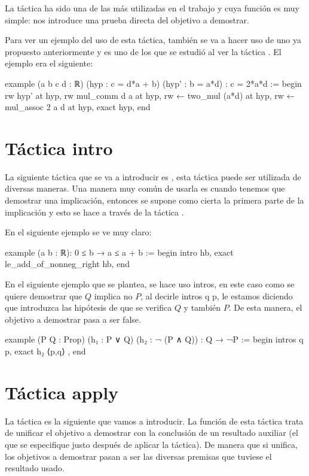 La táctica  ha sido una de las más utilizadas en
el trabajo y cuya función es muy simple: nos introduce una prueba
directa del objetivo a demostrar.

Para ver un ejemplo del uso de esta táctica, también se va a hacer uso
de uno ya propuesto anteriormente y es uno de los que se estudió al ver
la táctica . El ejemplo era el siguiente:

\begin{leancode}
example (a b c d : ℝ) (hyp : c = d*a + b) (hyp' : b = a*d) : c = 2*a*d :=
begin
  rw hyp' at hyp,
  rw mul_comm d a at hyp,
  rw ← two_mul (a*d) at hyp,
  rw ← mul_assoc 2 a d at hyp,
  exact hyp,
end
\end{leancode}

\section{Táctica intro}

La siguiente táctica que se va a introducir es
, esta táctica puede ser utilizada de
diversas maneras. Una manera muy común de usarla es cuando tenemos que
demostrar una implicación, entonces se supone como cierta la primera
parte de la implicación y esto se hace a través de la táctica
.

En el siguiente ejemplo se ve muy claro:

\begin{leancode}
example (a b : ℝ): 0 ≤ b → a ≤ a + b :=
begin
  intro hb,
  exact le_add_of_nonneg_right hb,
end
\end{leancode}

En el siguiente ejemplo que se plantea, se hace uso intros, en este caso
como se quiere demostrar que \(Q\) implica no \(P\), al decirle intros q
p, le estamos diciendo que introduzca las hipótesis de que se verifica
\(Q\) y también \(P\). De esta manera, el objetivo a demostrar pasa a
ser false.
\begin{leancode}
example (P Q : Prop) (h₁ : P ∨ Q) (h₂ : ¬ (P ∧ Q)) : Q → ¬P :=
begin
  intros q p,
  exact h₂ ⟨p,q⟩ ,
end
\end{leancode}

\section{Táctica apply}

La táctica  es la siguiente que vamos a
introducir. La función de esta táctica trata de unificar el objetivo a
demostrar con la conclusión de un resultado auxiliar (el que se
especifique justo después de aplicar la táctica). De manera que si
unifica, los objetivos a demostrar pasan a ser las diversas premisas que
tuviese el resultado usado.

